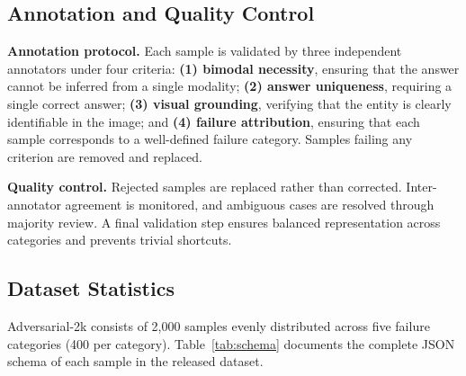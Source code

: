 \documentclass{article}
\begin{document}
\subsection{Annotation and Quality Control}

\textbf{Annotation protocol.}
Each sample is validated by three independent annotators under four criteria: \textbf{(1) bimodal necessity}, ensuring that the answer cannot be inferred from a single modality; \textbf{(2) answer uniqueness}, requiring a single correct answer; \textbf{(3) visual grounding}, verifying that the entity is clearly identifiable in the image; and \textbf{(4) failure attribution}, ensuring that each sample corresponds to a well-defined failure category. Samples failing any criterion are removed and replaced.

\textbf{Quality control.}
Rejected samples are replaced rather than corrected. Inter-annotator agreement is monitored, and ambiguous cases are resolved through majority review. A final validation step ensures balanced representation across categories and prevents trivial shortcuts.


\subsection{Dataset Statistics}
Adversarial-2k consists of 2{,}000 samples evenly distributed across five failure categories (400 per category). Table~\ref{tab:schema} documents the complete JSON schema of each sample in the released dataset.
\end{document}
